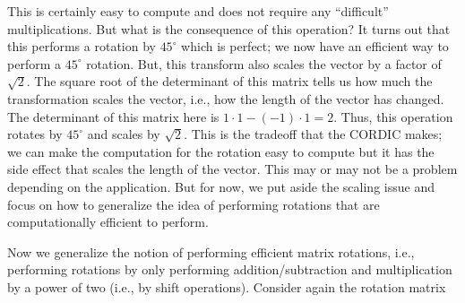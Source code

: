 This is certainly easy to compute and does not require any ``difficult'' multiplications. But what is the consequence of this operation? It turns out that this performs a rotation by $45^\circ$ which is perfect; we now have an efficient way to perform a $45^\circ$ rotation. But, this transform also scales the vector by a factor of  $\sqrt 2$.  The square root of the determinant of this matrix tells us how much the transformation scales the vector, i.e., how the length of the vector has changed. The determinant of this matrix here is $1 \cdot 1 -  (-1) \cdot 1 = 2$. Thus, this operation rotates by $45^\circ$ and scales by $\sqrt 2$. This is the tradeoff that the CORDIC makes; we can make the computation for the rotation easy to compute but it has the side effect that scales the length of the vector. This may or may not be a problem depending on the application. But for now, we put aside the scaling issue and focus on how to generalize the idea of performing rotations that are computationally efficient to perform.

Now we generalize the notion of performing efficient matrix rotations, i.e., performing rotations by only performing addition/subtraction and multiplication by a power of two (i.e., by shift operations). Consider again the rotation matrix 

